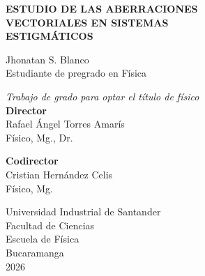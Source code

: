 \documentclass[12pt, a4paper]{book}
\numberwithin{equation}{chapter}
\begin{document}
\begin{titlepage}
\begin{center}
\vspace*{1.0cm}
{\LARGE \bfseries ESTUDIO DE LAS ABERRACIONES}\\[0.3cm]
{\LARGE \bfseries VECTORIALES EN SISTEMAS}\\[0.3cm]
{\LARGE \bfseries ESTIGMÁTICOS}\\[0.3cm]

\vspace{2.5cm}

{\large Jhonatan S. Blanco}\\
{\large Estudiante de pregrado en Física}

\vspace{1.5cm}
{\large \textit{Trabajo de grado para optar el título de físico}}\\

\vspace{1.8cm}
{\large \bfseries Director}\\
{\large Rafael Ángel Torres Amarís}\\
{\large Físico, Mg., Dr.}

\vspace{0.8cm}
{\large \bfseries Codirector}\\
{\large Cristian Hernández Celis}\\
{\large Físico, Mg.}

\vspace{1.8cm}
{\large Universidad Industrial de Santander}\\
{\large Facultad de Ciencias}\\
{\large Escuela de Física}\\
{\large Bucaramanga}\\
{\large 2026}
\end{center}
\end{titlepage}

\clearpage
\tableofcontents
\clearpage













\end{document}
